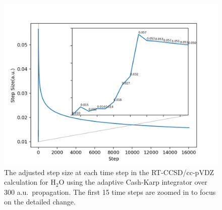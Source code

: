 \begin{figure}
    \centering
    \includegraphics[angle=0, scale=0.3]{ch3/Figs/3-3_new.png}
    \caption{The adjusted step size at each time step in the RT-CCSD/cc-pVDZ
calculation for H$_2$O using the adaptive Cash-Karp integrator over 300 a.u.\
propagation. The first 15 time steps are zoomed in to focus on the detailed change.}
    \label{fig:ck-step}
\end{figure}

